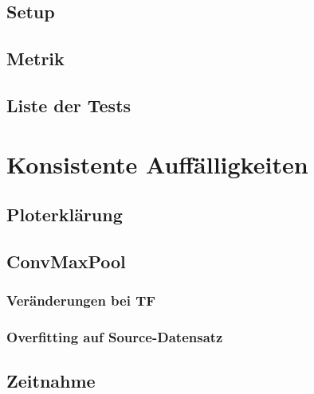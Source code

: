\documentclass[ngerman]{report}
\begin{document}
    \section{Setup}
    
    \section{Metrik}
    
    \section{Liste der Tests}
    

    \chapter{Konsistente Auffälligkeiten}  %
    
    \section{Ploterklärung}
    
    \section{ConvMaxPool}
    
    \subsection{Veränderungen bei TF}
    
    \subsection{Overfitting auf Source-Datensatz}
    
    \section{Zeitnahme}
    
\end{document}
